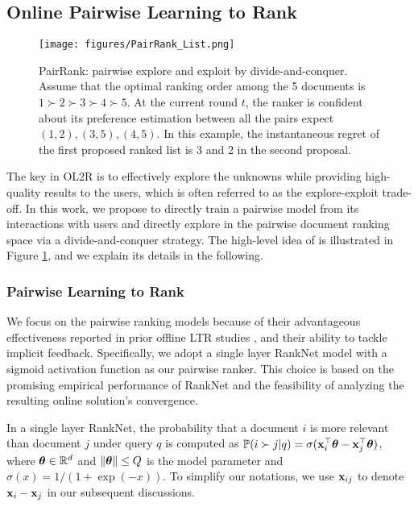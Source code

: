 \subsection{Online Pairwise Learning to Rank}
\label{sec_model}


\begin{figure}[t]
  \vspace{-2mm}
  \centering
  \texttt{[image: figures/PairRank\_List.png]}
  \caption{PairRank: pairwise explore and exploit by divide-and-conquer. Assume that the optimal ranking order among the 5 documents is $1 \succ 2 \succ 3 \succ 4 \succ 5$. At the current round $t$, the ranker is confident about its preference estimation between all the pairs expect $(1, 2), (3, 5), (4 ,5)$. In this example, the instantaneous regret of the first proposed ranked list is 3 and 2 in the second proposal.}
  \label{fig:model}
  \vspace{-2mm}
\end{figure}

The key in OL2R is to effectively explore the unknowns while providing high-quality results to the users, which is often referred to as the explore-exploit trade-off. In this work, we propose to directly train a pairwise model from its interactions with users and directly explore in the pairwise document ranking space via a divide-and-conquer strategy. The high-level idea of \model{} is illustrated in Figure \ref{fig:model}, and we explain its details in the following.


\subsubsection{Pairwise Learning to Rank}

We focus on the pairwise ranking models because of their advantageous effectiveness reported in prior offline LTR studies \cite{chapelle2011yahoo}, and their ability to tackle implicit feedback.
Specifically, we adopt a single layer RankNet model with a sigmoid activation function \cite{burges2010ranknet} as our pairwise ranker.
This choice is based on the promising empirical performance of RankNet and the feasibility of analyzing the resulting online solution's convergence. 

In a single layer RankNet, the probability that a document $i$ is more relevant than document $j$ under query $q$ is computed as $\mathbb{P}(i \succ j | q) = \sigma({\mathbf{x}^\top_i}\boldsymbol{\theta} - {\mathbf{x}^\top_j}\boldsymbol{\theta})$, where $\boldsymbol{\theta} \in \mathbb{R}^d$ and $\Vert\boldsymbol{\theta}\Vert \leq Q$ is the model parameter and $\sigma(x)= {1}/({1 + \exp(-x)})$.
To simplify our notations, we use $\mathbf{x}_{ij}$ to denote $\mathbf{x}_i - \mathbf{x}_j$ in our subsequent discussions.

